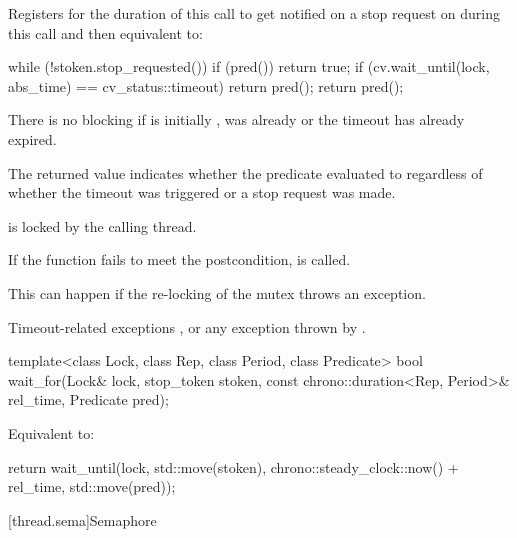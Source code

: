 \begin{itemdescr}
\pnum
\effects
Registers for the duration of this call 
to get notified on a stop request on 
during this call and then equivalent to:
\begin{codeblock}
while (!stoken.stop_requested()) {
  if (pred())
    return true;
  if (cv.wait_until(lock, abs_time) == cv_status::timeout)
    return pred();
}
return pred();
\end{codeblock}

\pnum
\begin{note}
There is no blocking if  is initially ,
 was already 
or the timeout has already expired.
\end{note}

\pnum
\begin{note}
The returned value indicates whether the predicate evaluated to 
regardless of whether the timeout was triggered or a stop request was made.
\end{note}

\pnum
\ensures
{} is locked by the calling thread.

\pnum
\remarks
If the function fails to meet the postcondition,
 is called.
\begin{note}
This can happen if the re-locking of the mutex throws an exception.
\end{note}

\pnum
\throws
Timeout-related exceptions ,
or any exception thrown by .
\end{itemdescr}

\begin{itemdecl}
template<class Lock, class Rep, class Period, class Predicate>
  bool wait_for(Lock& lock, stop_token stoken,
                const chrono::duration<Rep, Period>& rel_time, Predicate pred);
\end{itemdecl}

\begin{itemdescr}
\pnum
\effects
Equivalent to:
\begin{codeblock}
return wait_until(lock, std::move(stoken), chrono::steady_clock::now() + rel_time,
                  std::move(pred));
\end{codeblock}
\end{itemdescr}

[thread.sema]{Semaphore}

